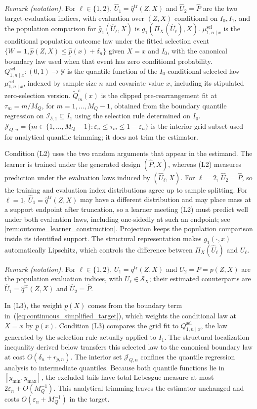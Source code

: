 \noindent\textit{Remark (notation).} For $\ell\in\{1,2\}$, $\hat U_1=\hat q^{\mathrm{tr}}(Z,X)$ and $\hat U_2=\hat P$ are the two target-evaluation indices, with evaluation over $(Z,X)$ conditional on $I_0,I_1$, and the population comparison for $\hat g_1(\hat U_\ell,X)$ is $g_1(\Pi_X(\hat U_\ell),X)$. $\mu^{\mathrm{sel}}_{1,n\mid x}$ is the conditional population outcome law under the fitted selection event $\{W=1,\hat p(Z,X)\le\hat{\underline p}(x)+\delta_n\}$ given $X=x$ and $I_0$, with the canonical boundary law used when that event has zero conditional probability. $Q^{\mathrm{sel}}_{1,n\mid x}:(0,1)\to\mathcal Y$ is the quantile function of the $I_0$-conditional selected law $\mu^{\mathrm{sel}}_{1,n\mid x}$, indexed by sample size $n$ and covariate value $x$, including its stipulated zero-selection version. $\widetilde Q_m^c(x)$ is the clipped pre-rearrangement fit at $\tau_m=m/M_Q$, for $m=1,\ldots,M_Q-1$, obtained from the boundary quantile regression on $\mathcal I_{\delta,1}\subseteq I_1$ using the selection rule determined on $I_0$. $\mathcal J_{Q,n}=\{m\in\{1,\ldots,M_Q-1\}:\varepsilon_n\le\tau_m\le1-\varepsilon_n\}$ is the interior grid subset used for analytical quantile trimming; it does not trim the estimator.


Condition (L2) uses the two random arguments that appear in the estimand. The learner is trained under the generated design $(\hat P,X)$, whereas (L2) measures prediction under the evaluation laws induced by $(\hat U_\ell,X)$. For $\ell=2$, $\hat U_2=\hat P$, so the training and evaluation index distributions agree up to sample splitting. For $\ell=1$, $\hat U_1=\hat q^{\mathrm{tr}}(Z,X)$ may have a different distribution and may place mass at a support endpoint after truncation, so a learner meeting (L2) must predict well under both evaluation laws, including one-sidedly at such an endpoint; see \cref{rem:outcome_learner_construction}. Projection keeps the population comparison inside its identified support. The structural representation makes $g_1(\cdot,x)$ automatically Lipschitz, which controls the difference between $\Pi_X(\hat U_\ell)$ and $U_\ell$.

\noindent\textit{Remark (notation).} For $\ell\in\{1,2\}$, $U_1=q^{\mathrm{tr}}(Z,X)$ and $U_2=P=p(Z,X)$ are the population evaluation indices, with $U_\ell\in\mathcal S_X$; their estimated counterparts are $\hat U_1=\hat q^{\mathrm{tr}}(Z,X)$ and $\hat U_2=\hat P$.


In (L3), the weight $\underline p(X)$ comes from the boundary term in~(\ref{eq:continuous_simplified_target}), which weights the conditional law at $X=x$ by $\underline p(x)$. Condition (L3) compares the grid fit to $Q^{\mathrm{sel}}_{1,n\mid x}$, the law generated by the selection rule actually applied to $I_1$. The structural localization inequality derived below transfers this selected law to the canonical boundary law at cost $O(\delta_n+r_{p,n})$. The interior set $\mathcal J_{Q,n}$ confines the quantile regression analysis to intermediate quantiles. Because both quantile functions lie in $[y_{\min},y_{\max}]$, the excluded tails have total Lebesgue measure at most $2\varepsilon_n+O(M_Q^{-1})$. This analytical trimming leaves the estimator unchanged and costs $O(\varepsilon_n+M_Q^{-1})$ in the target.

